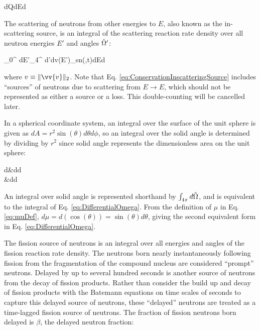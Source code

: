 \beq
\label{eq:ConservationExternalSource}
\left\lbrack\int d\volume Q\seat \right\rbrack dEd\hO  
\eeq

The scattering of neutrons from other energies to \(E\), also known as the in-scattering source, is an integral of the scattering reaction rate density over all neutron energies \(E'\) and angles \(\hat{\Omega}'\):

\beq
\label{eq:ConservationInscatteringSource}
\left\lbrack\int_{0}^{\infty} dE'\int_{4\pi}^{} d\hO  '\int d\volume v(E')\Sigma_s\seatout n(,t)\right\rbrack dEd\hO  
\eeq

where \(v\equiv\|\vv{v}\|_2\). Note that Eq. \eqref{eq:ConservationInscatteringSource} includes ``sources'' of neutrons due to scattering from \(E\rightarrow E\), which should not be represented as either a source or a loss. This double-counting will be cancelled later.

\begin{tcolorbox}[breakable]
In a spherical coordinate system, an integral over the surface of the unit sphere is given as \(dA=r^2\sin{(\theta)}d\theta d\phi\), so an integral over the solid angle is determined by dividing by \(r^2\) since solid angle represents the dimensionless area on the unit sphere:

\beqa
\label{eq:DifferentialOmega}
d\hO  \equiv&\sin{(\theta)}d\theta d\phi\\
\equiv&d\mu d\phi
\eeqa

An integral over solid angle is represented shorthand by \(\int_{4\pi}^{ } d\hat{\Omega}\), and is equivalent to the integral of Eq. \eqref{eq:DifferentialOmega}. From the definition of \(\mu\) in Eq. \eqref{eq:muDef}, \(d\mu=d(\cos{(\theta)})=\sin{(\theta)}d\theta\), giving the second equivalent form in Eq. \eqref{eq:DifferentialOmega}.
\end{tcolorbox}

The fission source of neutrons is an integral over all energies and angles of the fission reaction rate density. The neutrons born nearly instantaneously following fission from the fragmentation of the compound nucleus are considered ``prompt'' neutrons. Delayed by up to several hundred seconds is another source of neutrons from the decay of fission products. Rather than consider the build up and decay of fission products with the Batemann equations on time scales of seconds to capture this delayed source of neutrons, these ``delayed'' neutrons are treated as a time-lagged fission source of neutrons. The fraction of fission neutrons born delayed is \(\beta\), the delayed neutron fraction:

